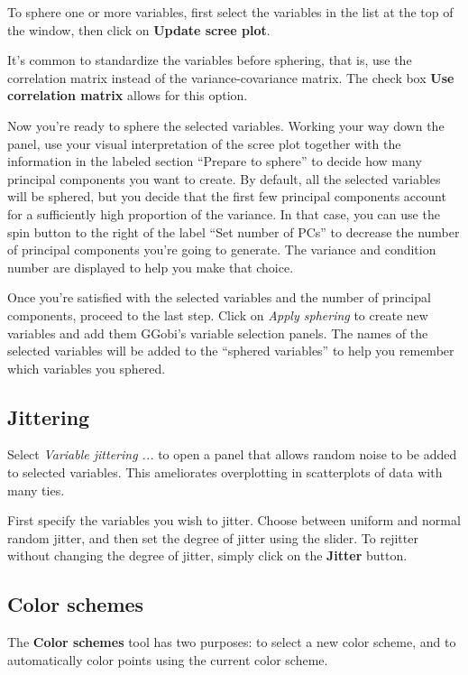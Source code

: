 \documentclass[11pt]{article}
\begin{document}
To sphere one or more variables, first select the variables in the list
at the top of the window, then click on {\bf Update scree plot}.

It's common to standardize the variables before sphering, that is, use
the correlation matrix instead of the variance-covariance matrix. The
check box {\bf Use correlation matrix} allows for this option.

Now you're ready to sphere the selected variables.  Working your way down
the panel, use your visual interpretation of the scree plot together
with the information in the labeled section ``Prepare to sphere'' to
decide how many principal components you want to create.  By default,
all the selected variables will be sphered, but you decide that the first
few principal components account for a sufficiently high proportion of
the variance.  In that case, you can use the spin button to the right
of the label ``Set number of PCs'' to decrease the number of principal
components you're going to generate.  The variance and condition number
are displayed to help you make that choice.

Once you're satisfied with the selected variables and the number of
principal components, proceed to the last step.  Click on {\em Apply
sphering} to create new variables and add them GGobi's variable selection
panels.  The names of the selected variables will be added to the
``sphered variables'' to help you remember which variables you sphered.

\subsection{Jittering}

Select {\em Variable jittering ...} to open a panel that allows
random noise to be added to selected variables.  This ameliorates
overplotting in scatterplots of data with many ties.

First specify the variables you wish to jitter.  Choose between uniform
and normal random jitter, and then set the degree of jitter using the
slider.  To rejitter without changing the degree of jitter, simply click
on the {\bf Jitter} button.

\subsection{Color schemes}
\label{slbl:ColorSchemes}

The {\bf Color schemes} tool has two purposes: to select a
new color scheme, and to automatically color points
using the current color scheme.
\end{document}
